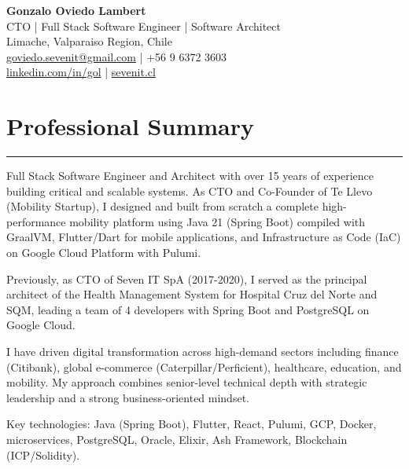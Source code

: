 \documentclass[11pt,a4paper]{article}
\begin{document}
\begin{center}
    {\LARGE \textbf{Gonzalo Oviedo Lambert}} \\
    \vspace{2pt}
    CTO | Full Stack Software Engineer | Software Architect \\
    \vspace{2pt}
    Limache, Valparaiso Region, Chile \\
    \vspace{2pt}
    \href{mailto:goviedo.sevenit@gmail.com}{goviedo.sevenit@gmail.com} | +56 9 6372 3603 \\
    \href{https://www.linkedin.com/in/gol}{linkedin.com/in/gol} | \href{https://sevenit.cl/}{sevenit.cl}
\end{center}

\section*{Professional Summary}
\hrule
\vspace{5pt}
\noindent
Full Stack Software Engineer and Architect with over 15 years of experience building critical and scalable systems. As CTO and Co-Founder of Te Llevo (Mobility Startup), I designed and built from scratch a complete high-performance mobility platform using Java 21 (Spring Boot) compiled with GraalVM, Flutter/Dart for mobile applications, and Infrastructure as Code (IaC) on Google Cloud Platform with Pulumi.

Previously, as CTO of Seven IT SpA (2017-2020), I served as the principal architect of the Health Management System for Hospital Cruz del Norte and SQM, leading a team of 4 developers with Spring Boot and PostgreSQL on Google Cloud.

I have driven digital transformation across high-demand sectors including finance (Citibank), global e-commerce (Caterpillar/Perficient), healthcare, education, and mobility. My approach combines senior-level technical depth with strategic leadership and a strong business-oriented mindset.

Key technologies: Java (Spring Boot), Flutter, React, Pulumi, GCP, Docker, microservices, PostgreSQL, Oracle, Elixir, Ash Framework, Blockchain (ICP/Solidity).
\end{document}
